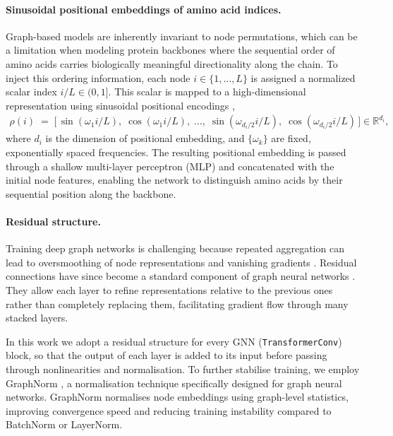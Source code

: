 \documentclass[a4paper,12pt]{article}
\begin{document}
\paragraph{Sinusoidal positional embeddings of amino acid indices.}
Graph-based models are inherently invariant to node permutations, which can be a limitation when modeling protein backbones where the sequential order of amino acids carries biologically meaningful directionality along the chain. To inject this ordering information, each node \(i \in \{1,\dots,L\}\) is assigned a normalized scalar index \(i/L \in (0,1]\). This scalar is mapped to a high-dimensional representation using sinusoidal positional encodings \citep{vaswaniAttentionAllYou2017},
\begin{align}\label{eq:positional-embedding}
    \rho(i) \;=\; \big[\, \sin(\omega_1 i/L),\; \cos(\omega_1 i/L),\; \dots,\; \sin(\omega_{d_i/2} i/L),\; \cos(\omega_{d_i/2} i/L)\,\big]\in\mathbb{R}^{d_i},
\end{align}
where \(d_i\) is the dimension of positional embedding, and \(\{\omega_k\}\) are fixed, exponentially spaced frequencies. The resulting positional embedding is passed through a shallow multi-layer perceptron (MLP) and concatenated with the initial node features, enabling the network to distinguish amino acids by their sequential position along the backbone.

\paragraph{Residual structure.}
Training deep graph networks is challenging because repeated aggregation can lead to oversmoothing of node representations and vanishing gradients \citep{li2018DeeperInsightsGraph,li2019DeepGCNsCanGCNs}. Residual connections \citep{he2016DeepResidualLearning} have since become a standard component of graph neural networks \citep{kipf2017SemiSupervisedClassificationGraph,li2019DeepGCNsCanGCNs}. They allow each layer to refine representations relative to the previous ones rather than completely replacing them, facilitating gradient flow through many stacked layers.

In this work we adopt a residual structure for every GNN (\texttt{TransformerConv}) block, so that the output of each layer is added to its input before passing through nonlinearities and normalisation. To further stabilise training, we employ GraphNorm \citep{cai2021GraphNormPrincipledApproach}, a normalisation technique specifically designed for graph neural networks. GraphNorm normalises node embeddings using graph-level statistics, improving convergence speed and reducing training instability compared to BatchNorm or LayerNorm. 
\end{document}
